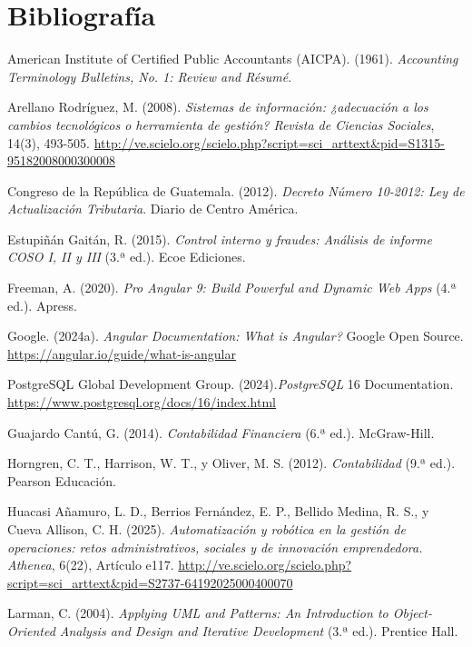 \newpage
\section*{Bibliografía} %

\begingroup
\setlength{\parindent}{0pt}
\setlength{\parskip}{0.5cm} %
\everypar{\hangindent=1.27cm\relax} %

American Institute of Certified Public Accountants (AICPA). (1961). \emph{Accounting Terminology Bulletins, No. 1: Review and Résumé}.

Arellano Rodríguez, M. (2008). \emph{Sistemas de información: ¿adecuación a los cambios tecnológicos o herramienta de gestión? Revista de Ciencias Sociales}, 14(3), 493-505. \url{http://ve.scielo.org/scielo.php?script=sci_arttext&pid=S1315-95182008000300008}

Congreso de la República de Guatemala. (2012). \emph{Decreto Número 10-2012: Ley de Actualización Tributaria}. Diario de Centro América.

Estupiñán Gaitán, R. (2015). \emph{Control interno y fraudes: Análisis de informe COSO I, II y III} (3.ª ed.). Ecoe Ediciones.

Freeman, A. (2020). \emph{Pro Angular 9: Build Powerful and Dynamic Web Apps} (4.ª ed.). Apress.

Google. (2024a). \emph{Angular Documentation: What is Angular?} Google Open Source. \url{https://angular.io/guide/what-is-angular}

PostgreSQL Global Development Group. (2024).\emph{PostgreSQL} 16 Documentation. \url{https://www.postgresql.org/docs/16/index.html}

Guajardo Cantú, G. (2014). \emph{Contabilidad Financiera} (6.ª ed.). McGraw-Hill.

Horngren, C. T., Harrison, W. T., y Oliver, M. S. (2012). \emph{Contabilidad} (9.ª ed.). Pearson Educación.

Huacasi Añamuro, L. D., Berrios Fernández, E. P., Bellido Medina, R. S., y Cueva Allison, C. H. (2025). \emph{Automatización y robótica en la gestión de operaciones: retos administrativos, sociales y de innovación emprendedora. Athenea}, 6(22), Artículo e117. \url{http://ve.scielo.org/scielo.php?script=sci_arttext&pid=S2737-64192025000400070}

Larman, C. (2004). \emph{Applying UML and Patterns: An Introduction to Object-Oriented Analysis and Design and Iterative Development} (3.ª ed.). Prentice Hall.

